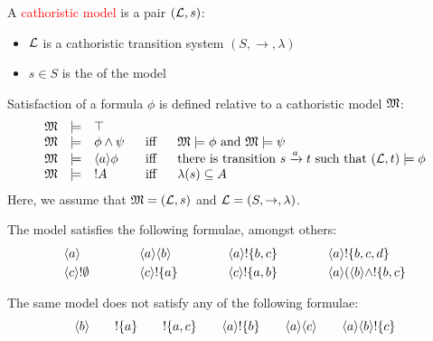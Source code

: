 \begin{frame}
A \textcolor{red}{cathoristic model} is a pair $(\mathcal{L}, s)$:
\begin{itemize}
\item
$\mathcal{L}$ is a cathoristic transition system $(S,
\rightarrow, \lambda)$
\item
$s \in S$ is the  of the model
\end{itemize}
\end{frame}

\begin{frame}
Satisfaction of a formula $\phi$ is defined relative to a cathoristic model $\frak{M}$:
\[
\begin{array}{lclcl}
  \frak{M} & \models & \top   \\
  \frak{M} & \models & \phi \land \psi &\ \mbox{ iff } \ & \frak{M}  \models \phi \mbox { and } \frak{M} \models \psi  \\
  \frak{M} & \models & \langle a \rangle \phi & \mbox{ iff } & \text{there is transition } s \xrightarrow{a} t \mbox { such that } (\mathcal{L}, t) \models \phi  \\
  \frak{M} & \models & ! A &\mbox{ iff } & \lambda(s) \subseteq A
\end{array}
\]
Here, we assume that $\frak{M} =
(\mathcal{L}, s)$ and $\mathcal{L} = (S, \rightarrow, \lambda)$.
\end{frame}

\begin{frame}

The model satisfies the following formulae, amongst
others:
\[
\begin{array}{lclclclcl}
\MAY{a} &\qquad&
\MAY{a} \MAY{b} &\qquad&
\MAY{a} \fBang \{b,c\} &\qquad&
\MAY{a} \fBang \{b,c,d\} \\[1mm]
\MAY{c} \fBang \emptyset &&
\MAY{c} \fBang \{a\} &&
\MAY{c} \fBang \{a,b\} &&
\MAY{a} (\MAY{b} \land \fBang \{b,c\}
\end{array}
\]
\end{frame}

\begin{frame}

The same model does not satisfy any of the following formulae:
\[
\langle b \rangle \qquad
! \{a\} \qquad
! \{a, c\} \qquad
\langle a \rangle ! \{b\} \qquad
\langle a \rangle \langle c \rangle \qquad
\langle a \rangle \langle b \rangle ! \{c\} 
\]

\end{frame}

\begin{frame}

\end{frame}

